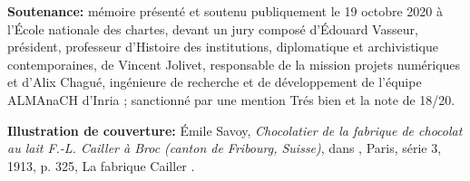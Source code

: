 \bigbreak

\textbf{Soutenance:} mémoire présenté et soutenu publiquement le 19 octobre 2020 à l'École nationale des chartes, devant un jury composé d'Édouard Vasseur, président, professeur d’Histoire des institutions, diplomatique et archivistique contemporaines, de Vincent Jolivet, responsable de la mission projets numériques et d'Alix Chagué, ingénieure de recherche et de développement de l’équipe ALMAnaCH d’Inria ; sanctionné par une mention Trés bien et la note de 18/20.

\bigbreak

\bigbreak

\textbf{Illustration de couverture:} Émile Savoy, \textit{Chocolatier de la fabrique de chocolat au lait F.-L. Cailler à Broc (canton de Fribourg, Suisse)}, dans \lodm, Paris, série 3, 1913, p. 325, \og La fabrique Cailler \fg.